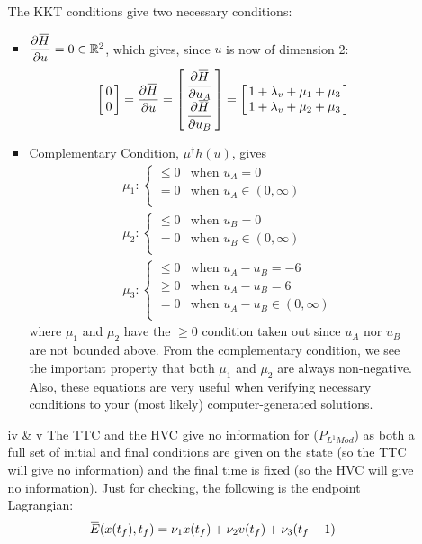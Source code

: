 \documentclass[10pt]{article}
\newcommand{\mat}[2][ccccccccccccccc]{\left [\!\!\begin{array}{#1} #2\\ \end{array} \!\!\right]}
\newcommand{\piece}[2][cll]{\left \{\begin{array}{#1} #2\\ \end{array} \right. }
\newcommand{\libzptrl}[2]{\dfrac{\partial #1}{\partial #2} }
\newcommand{\overbar}[1]{\mkern 1.5mu\overline{\mkern-1.5mu#1\mkern-1.5mu}\mkern 1.5mu}
\newcommand{\bbr}{\mathbb{R}}
\begin{document}
\begin{enumerate}[leftmargin=*]
\begin{enumerate}[label=\roman*]
                  The KKT conditions give two necessary conditions:
                  \begin{itemize}
                    \item $\libzptrl{\overbar H}{u} = 0\in\bbr^2$, which gives, since $u$ is now of dimension 2:
                          \begin{align*}
                            \mat{0\\0} = \libzptrl{\overbar H}{u}
                                       = \mat{\libzptrl{\overbar H}{u_A} \\\libzptrl{\overbar H}{u_B} }
                                       = \mat{1+\lambda_v + \mu_1+\mu_3 \\ 1+\lambda_v + \mu_2+\mu_3 }
                          \end{align*}
                    \item Complementary Condition, $\mu^\dagger h(u)$, gives
                            \begin{align*}
                                &\mu_1 : \piece{ \le0 & \text{when $u_A =0$} \\
                                                =0   & \text{when $u_A\in(0,\infty)$} } \\
                                &\mu_2 : \piece{ \le0 & \text{when $u_B =0$} \\
                                                =0   & \text{when $u_B\in(0,\infty)$} } \\
                                &\mu_3 : \piece{ \le0 & \text{when $u_A-u_B =-6$} \\
                                                \ge0 & \text{when $u_A-u_B =6$} \\
                                                =0   & \text{when $u_A-u_B\in(0,\infty)$} }
                            \end{align*}
                          where $\mu_1$ and $\mu_2$ have the $\ge0$ condition taken out since $u_A$ nor $u_B$ are not bounded above.  From the complementary condition, we see the important property that both $\mu_1$ and $\mu_2$ are always non-negative.  Also, these equations are very useful when verifying necessary conditions to your (most likely) computer-generated solutions.
                  \end{itemize}

        \item[iv \& v] The TTC and the HVC give no information for ($P_{L^1Mod}$) as both a full set of initial and final conditions are given on the state (so the TTC will give no information) and the final time is fixed (so the HVC will give no information).  Just for checking, the following is the endpoint Lagrangian:
            \begin{align*}
                \overbar E(x(t_f), t_f) = \nu_1x(t_f) + \nu_2v(t_f) + \nu_3(t_f-1)
            \end{align*}
      \end{enumerate}


\end{enumerate}
\end{document}
